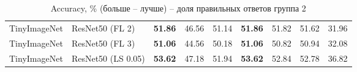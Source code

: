\begin{table}[h!]
{\begin{tabular}{llccccccc}
TinyImageNet &             ResNet50 (FL 2) & \textbf{51.86} &                  46.56 &                  51.14 & \textbf{51.86} &                  51.82 &                  51.62 &                  31.96 \\
TinyImageNet &             ResNet50 (FL 3) & \textbf{51.06} &                  44.56 &                  50.18 & \textbf{51.06} &                  50.82 &                  50.94 &                  32.08 \\
TinyImageNet &          ResNet50 (LS 0.05) & \textbf{53.62} &                  47.18 &                  51.94 & \textbf{53.62} &                  52.84 &                  52.78 &                  36.82 \\
\bottomrule
\end{tabular}%
}
\caption{Accuracy, \% (больше -- лучше) -- доля правильных ответов группа 2}
\label{tab:metrics:ACC_2}
\end{table}
